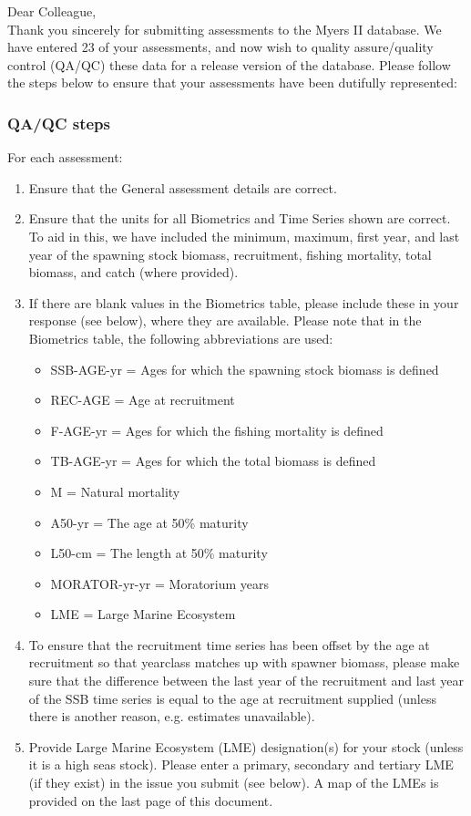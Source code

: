 \documentclass [a4paper, 10pt] {article}
\begin{document}
\noindent Dear Colleague,\\

\noindent Thank you sincerely for submitting assessments to the Myers II database. We have entered 23 of your assessments, and now wish to quality assure/quality control (QA/QC) these data for a release version of the database. Please follow the steps below to ensure that your assessments have been dutifully represented:
\subsubsection{QA/QC steps}
For each assessment:
\begin{enumerate}
\item Ensure that the General assessment details are correct.
\item Ensure that the units for all Biometrics and Time Series shown are correct. To aid in this, we have included the minimum, maximum, first year, and last year of the spawning stock biomass, recruitment, fishing mortality, total biomass, and  catch  (where provided). 
\item If there are blank values in the Biometrics table, please include these in your response (see below), where they are available.
Please note that in the Biometrics table, the following abbreviations are used:
\begin{itemize}
\item SSB-AGE-yr  = Ages for which the spawning stock biomass is defined
\item REC-AGE     = Age at recruitment
\item F-AGE-yr    = Ages for which the fishing mortality is defined 
\item TB-AGE-yr   = Ages for which the total biomass is defined
\item M      = Natural mortality
\item A50-yr      = The age at 50\% maturity
\item L50-cm      = The length at 50\% maturity
\item MORATOR-yr-yr = Moratorium years
\item LME = Large Marine Ecosystem\\
\end{itemize}
\item To ensure that the recruitment time series has been offset by the age at recruitment so that yearclass matches up with spawner biomass, please make sure that the difference between the last year of the recruitment and last year of the SSB time series is equal to the age at recruitment supplied (unless there is another reason, e.g. estimates unavailable). 
\item Provide Large Marine Ecosystem (LME) designation(s) for your stock (unless it is a high seas stock). Please enter a primary, secondary and tertiary LME (if they exist) in the issue you submit (see below). A map of the LMEs is provided on the last page of this document. 
\end{enumerate}
\vspace{-.25in}
\end{document}
